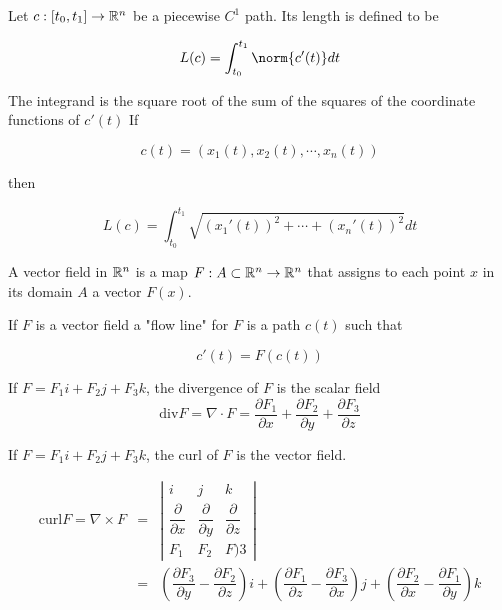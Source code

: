 \begin{defn}
	Let $c:[t_0,t_1] \rightarrow \mathbb{R}^n$ be a piecewise $C^1$ path. Its length is defined to be
	
	$$L(c) = \int^{t_1}_{t_0}\norm{c'(t)} dt$$
	
	The integrand is the square root of the sum of the squares of the coordinate functions of $c'(t)$ If
	
	$$c(t) = (x_1(t),x_2(t),\cdots,x_n(t))$$
	
	then
	
	$$L(c) = \int^{t_1}_{t_0}\sqrt{(x_1'(t))^2 + \cdots + (x_n'(t))^2}dt$$
\end{defn}

\begin{defn}
	A vector field in $\mathbb{R}^n$ is a map $F: A \subset \mathbb{R}^n \rightarrow \mathbb{R}^n$ that assigns to each point $x$ in its domain $A$ a vector $F(x)$.	
\end{defn}


\begin{defn}
	If $F$ is a vector field a "flow line" for $F$ is a path $c(t)$ such that
	
	$$c'(t) = F(c(t))$$	
\end{defn}

\begin{defn}
	If $F = F_1i + F_2 j + F_3 k$, the divergence of $F$ is the scalar field
	$$\text{div} F = \nabla \cdot F = \dfrac{\partial F_1}{\partial x} + \dfrac{\partial F_2}{\partial y} + \dfrac{\partial F_3}{\partial z}$$	
\end{defn}

\begin{defn}

If $F = F_1 i + F_2 j + F_3 k$, the curl of $F$ is the vector field.

\begin{eqnarray*}
	\text{curl}F = \nabla \times F &=& \left| \begin{matrix} i & j & k \\ \dfrac{\partial}{\partial x} & \dfrac{\partial}{\partial y} & \dfrac{\partial}{\partial z} \\ F_1 & F_2 & F)3\end{matrix}\right|	\\
	&=& \left(\dfrac{\partial F_3}{\partial y} - \dfrac{\partial F_2}{\partial z}\right)i + \left( \dfrac{\partial F_1}{\partial z} - \dfrac{\partial F_3}{\partial x}\right)j + \left( \dfrac{\partial F_2}{\partial x} - \dfrac{\partial F_1}{\partial y}\right) k
\end{eqnarray*}

\end{defn}


